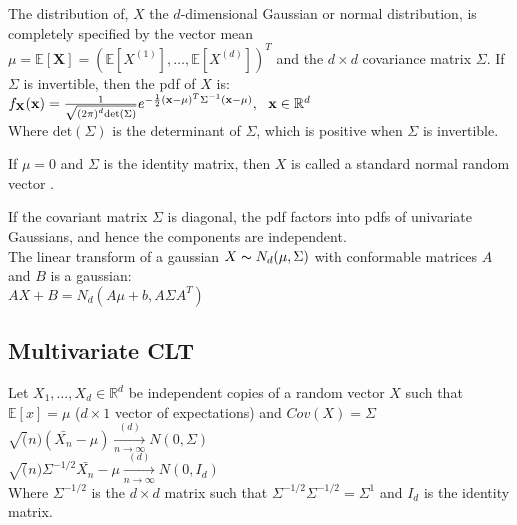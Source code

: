 The distribution of, $X$ the $d$-dimensional Gaussian or normal distribution, is completely specified by the vector mean $\mu =\mathbb E[\mathbf{X}]= (\mathbb E[X^{(1)}],\ldots ,\mathbb E[X^{(d)}])^ T$ and the $d \times d$ covariance matrix $\Sigma$. If $\Sigma$ is invertible, then the pdf of $X$ is:\\

$   f_{\mathbf X}(\mathbf x) = \frac{1}{\sqrt{\left(2\pi \right)^ d \text {det}(\Sigma )}}e^{-\frac{1}{2}(\mathbf x-\mu )^ T \Sigma ^{-1} (\mathbf x-\mu )}, ~ ~ ~ \\ \mathbf x\in \mathbb {R}^ d$\\


Where $\text {det}(\Sigma )$ is the determinant of $\Sigma$, which is positive when $\Sigma$ is invertible.

If $\mu = 0$ and $\Sigma$ is the identity matrix, then $X$ is called a standard normal random vector .

If the covariant matrix $\Sigma$ is diagonal, the pdf factors into pdfs of univariate Gaussians, and hence the components are independent.\\

The linear transform of a gaussian $X \thicksim N_d(\mu,\Sigma)$ with conformable matrices $A$ and $B$ is a gaussian:\\ 

$AX + B = N_d(A\mu + b, A \Sigma A^T)$

\subsection*{Multivariate CLT}

Let $X_1, \ldots, X_d \in \mathbb{R}^d$ be independent copies of a random vector $X$
such that $\mathbb{E}[x] = \mu$ ($d \times 1$ vector of expectations) and $Cov(X)= \Sigma$\\

$\sqrt(n)(\bar{X_n}-\mu) \xrightarrow[n \rightarrow \infty]{(d)} N(0,\Sigma)$\\

$\sqrt(n) \Sigma^{-1/2} \bar{X_n}-\mu \xrightarrow[n \rightarrow \infty]{(d)} N(0,I_d)$\\

Where $\Sigma^{-1/2}$ is the $d \times d$ matrix such that $\Sigma^{-1/2} \Sigma^{-1/2} = \Sigma^{1}$ and $I_d$ is the identity matrix.\\

